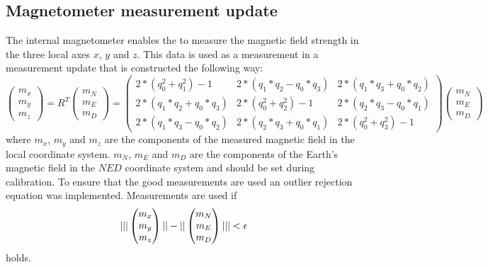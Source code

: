 \subsection{Magnetometer measurement update}
The internal magnetometer enables the \abbrROV to measure the magnetic field strength in the three local axes $x$, $y$ and $z$.
This data is used as a measurement in a measurement update that is constructed the following way:
\begin{equation}
    \begin{pmatrix}
        m_x\\
        m_y\\
        m_z
    \end{pmatrix} = 
    R^T
    \begin{pmatrix}
        m_N\\
        m_E\\
        m_D
    \end{pmatrix}=
    \begin{pmatrix}
        2*(q_0^2+q_1^2) - 1 &  2*(q_1*q_2-q_0*q_3) &    2*(q_1*q_3+q_0*q_2)\\
        2*(q_1*q_2+q_0*q_3) &    2*(q_0^2+q_2^2) - 1 &  2*(q_2*q_3-q_0*q_1)\\
        2*(q_1*q_3-q_0*q_2) &    2*(q_2*q_3+q_0*q_1) &    2*(q_0^2+q_3^2) - 1
    \end{pmatrix}
    \begin{pmatrix}
        m_N\\
        m_E\\
        m_D
    \end{pmatrix}
\end{equation}
where $m_x$, $m_y$ and $m_z$ are the components of the measured magnetic field in the local coordinate system. $m_N$, $m_E$ and $m_D$ are the components of the Earth's magnetic field in the $NED$ coordinate system and should be set during calibration.
To ensure that the good measurements are used an outlier rejection equation was implemented. Measurements are used if 
\begin{equation}
        | ||
    \begin{pmatrix}
        m_x\\
        m_y\\
        m_z
    \end{pmatrix}||
    -
    ||
    \begin{pmatrix}
        m_N\\
        m_E\\
        m_D
    \end{pmatrix}||
     | < \epsilon
\end{equation}
holds.



